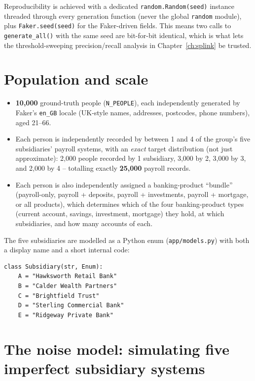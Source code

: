 \documentclass[11pt]{report}
\newcommand{\code}[1]{\lstinline[style=plain]!#1!}
\begin{document}
\begin{engbox}
Reproducibility is achieved with a dedicated \code{random.Random(seed)} instance threaded through every generation function (never the global \code{random} module), plus \code{Faker.seed(seed)} for the Faker-driven fields. This means two calls to \code{generate_all()} with the same seed are bit-for-bit identical, which is what lets the threshold-sweeping precision/recall analysis in Chapter~\ref{ch:splink} be trusted.
\end{engbox}

\section{Population and scale}

\begin{itemize}
\item \textbf{10,000} ground-truth people (\code{N_PEOPLE}), each independently generated by Faker's \code{en_GB} locale (UK-style names, addresses, postcodes, phone numbers), aged 21--66.
\item Each person is independently recorded by between 1 and 4 of the group's five subsidiaries' payroll systems, with an \emph{exact} target distribution (not just approximate): 2,000 people recorded by 1 subsidiary, 3,000 by 2, 3,000 by 3, and 2,000 by 4 -- totalling exactly \textbf{25,000} payroll records.
\item Each person is also independently assigned a banking-product ``bundle'' (payroll-only, payroll + deposits, payroll + investments, payroll + mortgage, or all products), which determines which of the four banking-product types (current account, savings, investment, mortgage) they hold, at which subsidiaries, and how many accounts of each.
\end{itemize}

The five subsidiaries are modelled as a Python enum (\texttt{app/models.py}) with both a display name and a short internal code:

\begin{lstlisting}[style=py, caption={The five subsidiaries (\texttt{app/models.py})}]
class Subsidiary(str, Enum):
    A = "Hawksworth Retail Bank"
    B = "Calder Wealth Partners"
    C = "Brightfield Trust"
    D = "Sterling Commercial Bank"
    E = "Ridgeway Private Bank"
\end{lstlisting}

\section{The noise model: simulating five imperfect subsidiary systems}
\end{document}
